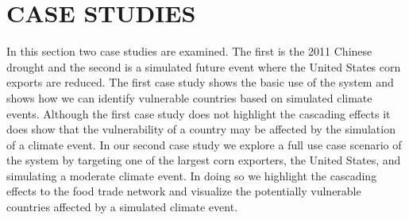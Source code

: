 \chapter{CASE STUDIES}
\label{caseStudyChapter}
In this section two case studies are examined. The first is the 2011 Chinese drought and the second is a simulated future event where the United States corn exports are reduced. The first case study shows the basic use of the system and shows how we can identify vulnerable countries based on simulated climate events. Although the first case study does not highlight the cascading effects it does show that the vulnerability of a country may be affected by the simulation of a climate event. In our second case study we explore a full use case scenario of the system by targeting one of the largest corn exporters, the United States, and simulating a moderate climate event. In doing so we highlight the cascading effects to the food trade network and visualize the potentially vulnerable countries affected by a simulated climate event.\par
